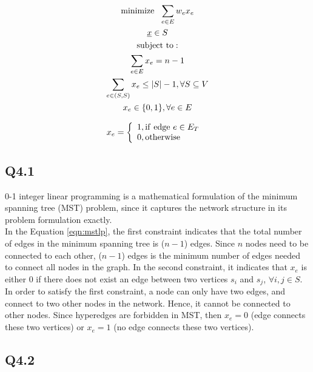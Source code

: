 \documentclass[letter,12pt]{article}
\begin{document}
\begin{eqnarray}
\label{eqn:mstlp}
	\begin{gathered}[b]
	{\rm minimize}\ \ \displaystyle\sum_{e \in E} w_{e}x_{e} \\
	\underline{x} \in S \\
	{\rm subject\ to:} \\
	\displaystyle\sum_{e \in E} x_{e} = n - 1 \\
	\displaystyle\sum_{e \in (S, S)} x_{e} \leq |S| - 1, \forall S \subseteq V  \\
	x_{e} \in \{0, 1\}, \forall e \in E
	\end{gathered}
\end{eqnarray}

\[
x_{e} = \left\{
	\begin{array}{l@{\quad}}
	1, {\rm if\ edge\ }e \in E_{T} \\
	0, {\rm otherwise}
	\end{array}
	\right.
\]

\subsection{Q4.1}
\label{ssec:q4d1}

0-1 integer linear programming is a mathematical formulation of the minimum spanning tree (MST) problem, since it captures the network structure in its problem formulation exactly. \\

In the Equation \ref{eqn:mstlp}, the first constraint indicates that the total number of edges in the minimum spanning tree is ($n - 1$) edges. Since $n$ nodes need to be connected to each other, ($n - 1$) edges is the minimum number of edges needed to connect all nodes in the graph. In the second constraint, it indicates that $x_{e}$ is either 0 if there does not exist an edge between two vertices $s_{i}$ and $s_{j}$, $\forall i, j \in S$. In order to satisfy the first constraint, a node can only have two edges, and connect to two other nodes in the network. Hence, it cannot be connected to other nodes. Since hyperedges are forbidden in MST, then $x_{e} = 0$ (edge connects these two vertices) or $x_{e} = 1$ (no edge connects these two vertices).

\subsection{Q4.2}
\label{ssec:q4d2}
\end{document}
